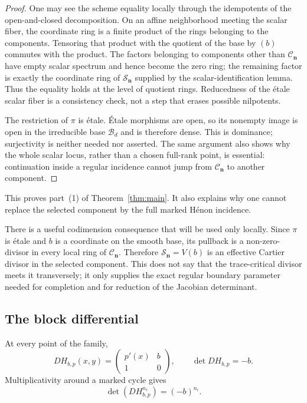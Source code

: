 \documentclass[11pt]{article}
\theoremstyle{definition}
\theoremstyle{remark}
\newcommand{\cB}{\mathcal B}
\newcommand{\cC}{\mathcal C}
\newcommand{\cS}{\mathcal S}
\newcommand{\bn}{\mathbf n}
\begin{document}
\begin{proof}
One may see the scheme equality locally through the idempotents of the
open-and-closed decomposition.  On an affine neighborhood meeting the
scalar fiber, the coordinate ring is a finite product of the rings belonging
to the components.  Tensoring that product with the quotient of the base by
$(b)$ commutes with the product.  The factors belonging to components other
than $\cC_{\bn}$ have empty scalar spectrum and hence become the zero ring;
the remaining factor is exactly the coordinate ring of $\cS_{\bn}$ supplied
by the scalar-identification lemma.  Thus the equality holds at the
level of quotient rings.  Reducedness of the étale scalar fiber is a
consistency check, not a step that erases possible nilpotents.

The restriction of $\pi$ is étale.  Étale morphisms are open, so its
nonempty image is open in the irreducible base $\cB_d$ and is therefore
dense.  This is dominance; surjectivity is neither needed nor asserted.
The same argument also shows why the whole scalar locus, rather than a
chosen full-rank point, is essential: continuation inside a regular
incidence cannot jump from $\cC_{\bn}$ to another component.
\end{proof}

This proves part~(1) of Theorem~\ref{thm:main}.  It also explains why one
cannot replace the selected component by the full marked Hénon incidence.

There is a useful codimension consequence that will be used only locally.
Since $\pi$ is étale and $b$ is a coordinate on the smooth base, its pullback
is a non-zero-divisor in every local ring of $\cC_{\bn}$.  Therefore
$\cS_{\bn}=V(b)$ is an effective Cartier divisor in the selected component.
This does not say that the trace-critical divisor meets it transversely; it
only supplies the exact regular boundary parameter needed for completion
and for reduction of the Jacobian determinant.

\subsection{The block differential}

At every point of the family,
\[
  DH_{b,p}(x,y)
  =
  \begin{pmatrix}
    p'(x)&b\\
    1&0
  \end{pmatrix},
  \qquad
  \det DH_{b,p}=-b.
\]
Multiplicativity around a marked cycle gives
\begin{equation}
\label{eq:return-determinant}
  \det(DH_{b,p}^{n_i})=(-b)^{n_i}.
\end{equation}
\end{document}
